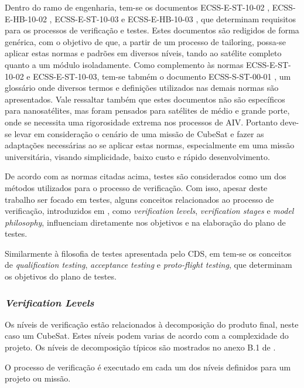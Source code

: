 Dentro do ramo de engenharia, tem-se os documentos ECSS-E-ST-10-02 \cite{ecss-e-st-10-02}, ECSS-E-HB-10-02 \cite{ecss-e-hb-10-02}, ECSS-E-ST-10-03 \cite{ecss-e-st-10-03} e ECSS-E-HB-10-03 \cite{ecss-e-hb-10-03}, que determinam requisitos para os processos de verificação e testes. Estes documentos são redigidos de forma genérica, com o objetivo de que, a partir de um processo de tailoring, possa-se aplicar estas normas e padrões em diversos níveis, tando ao satélite completo quanto a um módulo isoladamente.
Como complemento às normas ECSS-E-ST-10-02 e ECSS-E-ST-10-03, tem-se tabmém o documento ECSS-S-ST-00-01 \cite{ecss-s-st-00-01}, um glossário onde diversos termos e definições utilizados nas demais normas são apresentados.
Vale ressaltar também que estes documentos não são específicos para nanosatélites, mas foram pensados para satélites de médio e grande porte, onde se necessita uma rigorosidade extrema nos processos de \gls{AIV}.
Portanto deve-se levar em consideração o cenário de uma missão de CubeSat e fazer as adaptações necessárias ao se aplicar estas normas, especialmente em uma missão universitária, visando simplicidade, baixo custo e rápido desenvolvimento.

De acordo com as normas citadas acima, testes são considerados como um dos métodos utilizados para o processo de verificação.
Com isso, apesar deste trabalho ser focado em testes, alguns conceitos relacionados ao processo de verificação, introduzidos em \cite{ecss-e-st-10-02}, como \textit{verification levels}, \textit{verification stages} e \textit{model philosophy}, influenciam diretamente nos objetivos e na elaboração do plano de testes.

Similarmente à filosofia de testes apresentada pelo \gls{CDS}, em \textcite{ecss-e-st-10-03} tem-se os conceitos de \textit{qualification testing}, \textit{acceptance testing} e \textit{proto-flight testing}, que determinam os objetivos do plano de testes.

\subsubsection*{\textit{Verification Levels}}

Os níveis de verificação estão relacionados à decomposição do produto final, neste caso um CubeSat. Estes níveis podem varias de acordo com a complexidade do projeto.
Os níveis de decomposição típicos são mostrados no anexo B.1 de \textcite{ecss-s-st-00-01}.

O processo de verificação é executado em cada um dos níveis definidos para um projeto ou missão.

